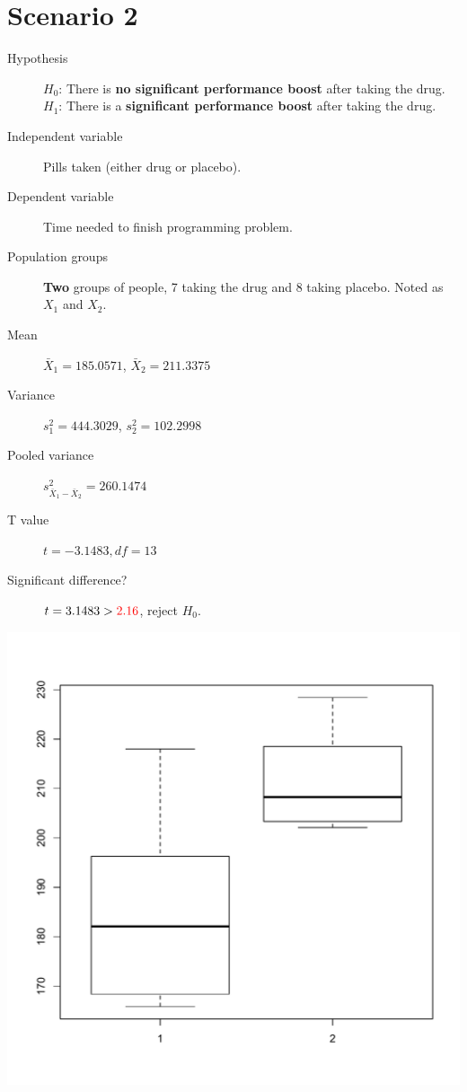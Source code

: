 \documentclass[a4paper,10pt,twocolumn]{article}
\begin{document}
\section{Scenario 2} %
\label{sec:scenario_2}
\begin{description}
	\item[Hypothesis] 
		$H_0$: There is \textbf{no significant performance boost} after taking the drug.\\
		$H_1$: There is a \textbf{significant performance boost} after taking the drug.
	\item[Independent variable] Pills taken (either drug or placebo).
	\item[Dependent variable] Time needed to finish programming problem.
	\item[Population groups] \textbf{Two} groups of people, 7 taking the drug and 8 taking placebo. Noted as $X_1$ and $X_2$.
	\item[Mean] $\bar{X}_1=185.0571$, $\bar{X}_2=211.3375$
	\item[Variance] $s_1^2=444.3029$, $s_2^2=102.2998$
	\item[Pooled variance] $s_{\bar{X}_1-\bar{X}_2}^2=260.1474$
	\item[T value] $t = -3.1483, df = 13$
	\item[Significant difference?] $t = 3.1483 > \color{red}{2.16}$, reject $H_0$. \color{red}{Should be one-tail test, so 2.16 should be 1.771.}
\end{description}
\includegraphics[width=.5\textwidth]{s2.pdf}
\end{document}
